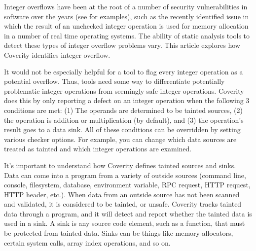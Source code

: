 Integer overflows have been at the root of a number of security vulnerabilities in software over the years (see \autocite{20210628:cwe-190} for examples), such as the recently identified issue in which the result of an unchecked integer operation is used for memory allocation in a number of real time operating systems.\autocite{20210628:ics21-119-04} The ability of static analysis tools to detect these types of integer overflow problems vary. This article explores how Coverity identifies integer overflow.

It would not be especially helpful for a tool to flag every integer operation as a potential overflow. Thus, tools need some way to differentiate potentially problematic integer operations from seemingly safe integer operations. Coverity does this by only reporting a defect on an integer operation when the following 3 conditions are met: (1) The operands are determined to be tainted sources, (2) the operation is addition or multiplication (by default), and (3) the operation’s result goes to a data sink.\autocite{20210628:coverity} All of these conditions can be overridden by setting various checker options. For example, you can change which data sources are treated as tainted and which integer operations are examined.

It’s important to understand how Coverity defines tainted sources and sinks. Data can come into a program from a variety of outside sources (command line, console, filesystem, database, environment variable, RPC request, HTTP request, HTTP header, etc.). When data from an outside source has not been scanned and validated, it is considered to be tainted, or unsafe. Coverity tracks tainted data through a program, and it will detect and report whether the tainted data is used in a sink. A sink is any source code element, such as a function, that must be protected from tainted data. Sinks can be things like memory allocators, certain system calls, array index operations, and so on. 

